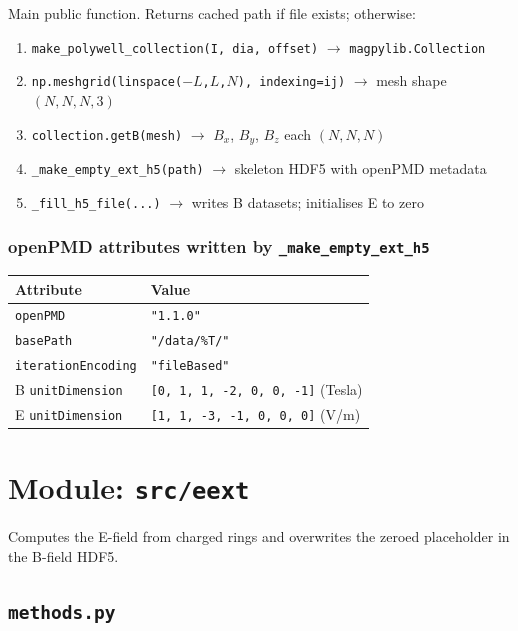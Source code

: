 \documentclass[11pt, a4paper]{article}
\begin{document}
Main public function. Returns cached path if file exists; otherwise:
\begin{enumerate}
    \item \texttt{make\_polywell\_collection(I, dia, offset)} $\to$ \texttt{magpylib.Collection}
    \item \texttt{np.meshgrid(linspace($-L$,$L$,$N$), indexing=\textquotesingle ij\textquotesingle)} $\to$ mesh shape $(N,N,N,3)$
    \item \texttt{collection.getB(mesh)} $\to$ $B_{x}$, $B_{y}$, $B_{z}$ each $(N,N,N)$
    \item \texttt{\_make\_empty\_ext\_h5(path)} $\to$ skeleton HDF5 with openPMD metadata
    \item \texttt{\_fill\_h5\_file(...)} $\to$ writes B datasets; initialises E to zero
\end{enumerate}

\subsubsection*{openPMD attributes written by \texttt{\_make\_empty\_ext\_h5}}

\begin{longtable}{L{4.5cm} L{9cm}}
\toprule
\textbf{Attribute} & \textbf{Value} \\
\midrule
\texttt{openPMD}           & \texttt{"1.1.0"} \\
\texttt{basePath}          & \texttt{"/data/\%T/"} \\
\texttt{iterationEncoding} & \texttt{"fileBased"} \\
B \texttt{unitDimension}   & \texttt{[0, 1, 1, -2, 0, 0, -1]} (Tesla) \\
E \texttt{unitDimension}   & \texttt{[1, 1, -3, -1, 0, 0, 0]} (V/m) \\
\bottomrule
\end{longtable}

\section{Module: \texttt{src/eext}}

Computes the E-field from charged rings and overwrites the zeroed placeholder
in the B-field HDF5.

\subsection{\texttt{methods.py}}
\end{document}
